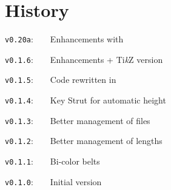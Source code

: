 \documentclass[english,11pt,a4paper]{article}
\providecommand\tikzlogo{Ti\textit{k}Z}
\let\TikZ\tikzlogo
\begin{document}
\vfill

\section{History}

\verb|v0.20a|:~~~~Enhancements with 

\verb|v0.1.6|:~~~~Enhancements + {\TikZ} version

\verb|v0.1.5|:~~~~Code rewritten in 

\verb|v0.1.4|:~~~~Key \textsf{Strut} for automatic height

\verb|v0.1.3|:~~~~Better management of files

\verb|v0.1.2|:~~~~Better management of lengths

\verb|v0.1.1|:~~~~Bi-color belts

\verb|v0.1.0|:~~~~Initial version

\vspace*{15mm}
\end{document}
